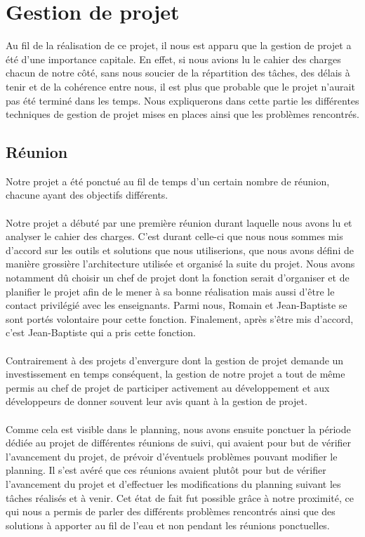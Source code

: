 \documentclass[a4paper,11pt]{article}
\begin{document}
\section{Gestion de projet}
Au fil de la réalisation de ce projet, il nous est apparu que la gestion de projet a été d'une importance capitale. En effet, si nous avions lu le cahier des charges chacun de notre côté, sans nous soucier de la répartition des tâches, des délais à tenir et de la cohérence entre nous, il est plus que probable que le projet n'aurait pas été terminé dans les temps. Nous expliquerons dans cette partie les différentes techniques de gestion de projet mises en places ainsi que les problèmes rencontrés.

\subsection{Réunion}
Notre projet a été ponctué au fil de temps d'un certain nombre de réunion, chacune ayant des objectifs différents.

\paragraph{} Notre projet a débuté par une première réunion durant laquelle nous avons lu et analyser le cahier des charges. C'est durant celle-ci que nous nous sommes mis d'accord sur les outils et solutions que nous utiliserions, que nous avons défini de manière grossière l'architecture utilisée et organisé la suite du projet. Nous avons notamment dû choisir un chef de projet dont la fonction serait d'organiser et de planifier le projet afin de le mener à sa bonne réalisation mais aussi d'être le contact privilégié avec les enseignants. Parmi nous, Romain et Jean-Baptiste se sont portés volontaire pour cette fonction. Finalement, après s'être mis d'accord, c'est Jean-Baptiste qui a pris cette fonction.

\paragraph{} Contrairement à des projets d'envergure dont la gestion de projet demande un investissement en temps conséquent, la gestion de notre projet a tout de même permis au chef de projet de participer activement au développement et aux développeurs de donner souvent leur avis quant à la gestion de projet.

\paragraph{} Comme cela est visible dans le planning, nous avons ensuite ponctuer la période dédiée au projet de différentes réunions de suivi, qui avaient pour but de vérifier l'avancement du projet, de prévoir d’éventuels problèmes pouvant modifier le planning. Il s'est avéré que ces réunions avaient plutôt pour but de vérifier l'avancement du projet et d'effectuer les modifications du planning suivant les tâches réalisés et à venir. Cet état de fait fut possible grâce à notre proximité, ce qui nous a permis de parler des différents problèmes rencontrés ainsi que des solutions à apporter au fil de l'eau et non pendant les réunions ponctuelles.
\end{document}
